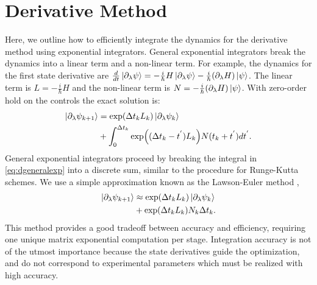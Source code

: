 \section{Derivative Method \label{appendix:derivative}}
Here, we outline how to efficiently integrate the dynamics
for the derivative method using exponential integrators.
General exponential integrators break the dynamics into a linear term and a non-linear term.
For example, the dynamics for the first state derivative
are $\frac{d}{dt} \ket{\partial_{\lambda} \psi} =
-\frac{i}{\hbar} H  \ket{\partial_{\lambda} \psi} -
\frac{i}{\hbar} (\partial_{\lambda} H) \ket{\psi}$.
The linear term is $L = -\frac{i}{\hbar} H$ and the non-linear
term is $N = -\frac{i}{\hbar} (\partial_{\lambda} H) \ket{\psi}$.
With zero-order hold on the controls the exact solution is:
\begin{equation}
  \label{eq:dgeneralexp}
  \begin{aligned}
    \ket{\partial_{\lambda} \psi_{k + 1}} &= \exp(\Delta t_{k} L_{k})
    \ket{\partial_{\lambda} \psi_{k}}\\
    &+ \int_{0}^{\Delta t_{k}} \exp((\Delta t_{k} - t^{'})L_{k})
    N(t_{k} + t^{'}) dt^{'}.\\
  \end{aligned}
\end{equation}
General exponential integrators proceed by breaking the integral in \eqref{eq:dgeneralexp}
into a discrete sum, similar to the procedure
for Runge-Kutta schemes. We use a simple approximation known as the Lawson-Euler
method \cite{berland2005solving},
\begin{equation}
  \begin{aligned}
    \ket{\partial_{\lambda} \psi_{k + 1}} &\approx \exp(\Delta t_{k}L_{k})
    \ket{\partial_{\lambda} \psi_{k}}\\
    &+ \exp(\Delta t_{k}L_{k}) N_{k} \Delta t_{k}.\\
  \end{aligned}
\end{equation}
This method provides a good tradeoff between accuracy and efficiency, requiring one unique matrix
exponential computation per stage. Integration accuracy is not of the utmost importance because the
state derivatives guide the optimization, and do not correspond to experimental parameters
which must be realized with high accuracy.




